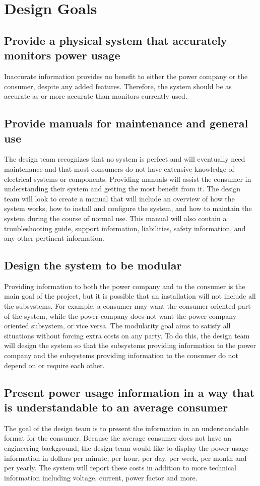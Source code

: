 \section{Design Goals}
\subsection{Provide a physical system that accurately monitors power usage}
Inaccurate information provides no benefit to either the power company or the consumer, despite any added features. Therefore, the system should be as accurate as or more accurate than monitors currently used.

\subsection{Provide manuals for maintenance and general use}
The design team recognizes that no system is perfect and will eventually need maintenance and that most consumers do not have extensive knowledge of electrical systems or components. Providing manuals will assist the consumer in understanding their system and getting the most benefit from it. The design team will look to create a manual that will include an overview of how the system works, how to install and configure the system, and how to maintain the system during the course of normal use. This manual will also contain a troubleshooting guide, support information, liabilities, safety information, and any other pertinent information.

\subsection{Design the system to be modular}
Providing information to both the power company and to the consumer is the main goal of the project, but it is possible that an installation will not include all the subsystems. For example, a consumer may want the consumer-oriented part of the system, while the power company does not want the power-company-oriented subsystem, or vice versa. The modularity goal aims to satisfy all situations without forcing extra costs on any party. To do this, the design team will design the system so that the subsystems providing information to the power company and the subsystems providing information to the consumer do not depend on or require each other.

\subsection{Present power usage information in a way that is understandable to an average consumer}
The goal of the design team is to present the information in an understandable format for the consumer. Because the average consumer does not have an engineering background, the design team would like to display the power usage information in dollars per minute, per hour, per day, per week, per month and per yearly. The system will report these costs in addition to more technical information including voltage, current, power factor and more.


